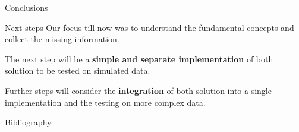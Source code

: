 \documentclass{beamer}
\begin{document}
\begin{section}{Conclusions}
	
    \begin{frame}[plain]{}
		\sectionpage
	\end{frame}

	\begin{frame}{Next steps}
		Our focus till now was to understand the fundamental concepts and collect the missing information.
		
		\vspace{0.5 cm}
		The next step will be a \textbf{simple and separate implementation} of both solution to be tested on simulated data.
		
		\vspace{0.5 cm}
		Further steps will consider the \textbf{integration} of both solution into a single implementation and the testing on more complex data.
	\end{frame}

	\begin{frame}{Bibliography}
		\nocite{*}
		
		\tiny{  }

	

	\end{frame}
\end{section}
\end{document}
